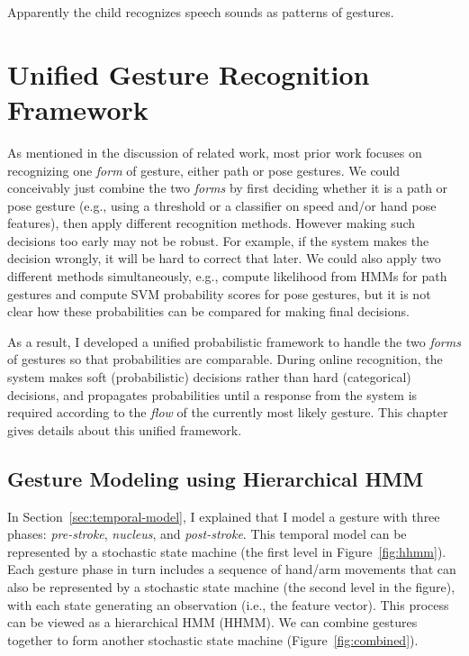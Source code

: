 \begin{savequote}
Apparently the child recognizes speech sounds as patterns of gestures.
\end{savequote}
\chapter{Unified Gesture Recognition Framework}

As mentioned in the discussion of related work, most prior work
focuses on recognizing one \textit{form} of gesture, either path or pose
gestures.
We could conceivably just combine the two \textit{forms} by first deciding
whether it is a path or pose gesture (e.g., using a threshold or a
classifier on speed and/or hand pose features), then apply different recognition
methods.
However making such decisions too early may not be robust. For example, if the
system makes the decision wrongly, it will be hard to correct that later.
We could also apply two different methods simultaneously, e.g., compute likelihood
from HMMs for path gestures and compute SVM probability scores for pose
gestures, but it is not clear how these probabilities can be compared for making
final decisions.

As a result, I developed a unified probabilistic framework to handle the two
\textit{forms} of gestures so that probabilities are comparable. During online
recognition, the system makes soft (probabilistic) decisions rather than hard
(categorical) decisions, and propagates probabilities until a response
from the system is required according to the \textit{flow} of the currently most
likely gesture.
This chapter gives details about this unified framework.

\section{Gesture Modeling using Hierarchical HMM}
In Section~\ref{sec:temporal-model}, I explained that I model
a gesture with three phases: \textit{pre-stroke}, \textit{nucleus}, and
\textit{post-stroke}.
This temporal model can be represented by a stochastic state
machine (the first level in Figure~\ref{fig:hhmm}).
Each gesture phase in turn includes a sequence of hand/arm movements that can 
also be represented by a stochastic state machine (the second level in the figure), with each state generating an
observation (i.e., the feature vector).
This process can be viewed as a hierarchical HMM (HHMM). We can combine gestures
together to form another stochastic state machine (Figure~\ref{fig:combined}).

